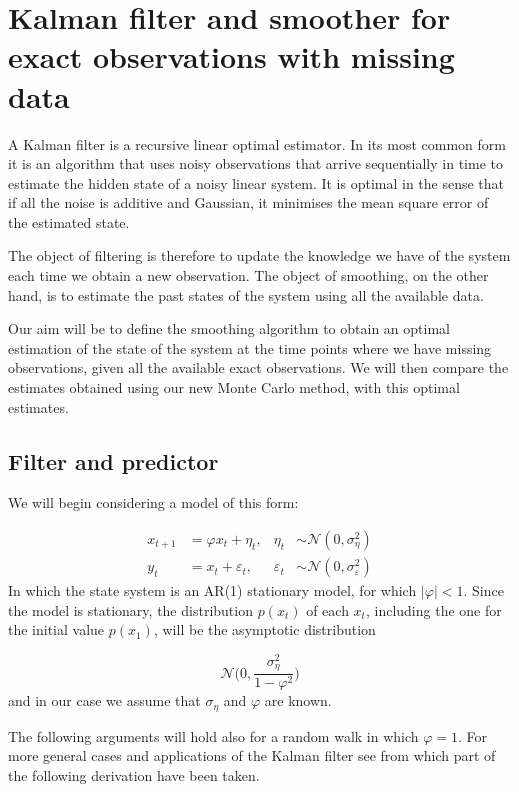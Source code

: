 \documentclass[11pt,a4paper]{article}
\begin{document}
\section{Kalman filter and smoother for exact observations with missing data}

A Kalman filter is a recursive linear optimal estimator. In its most common form it is an algorithm that uses noisy observations that arrive sequentially in time to estimate the hidden state of a noisy linear system. It is optimal in the sense that if all the noise is additive and Gaussian, it minimises the mean square error of the estimated state.

The object of filtering is therefore to update the knowledge we have of the system each time we obtain a new observation.
The object of smoothing, on the other hand, is to estimate the past states of the system using all the available data.

Our aim will be to define the smoothing algorithm to obtain an optimal estimation of the state of the system at the time points where we have missing observations, given all the available exact observations. We will then compare the estimates obtained using our new Monte Carlo method, with this optimal estimates. 

\subsection{Filter and predictor}

We will begin considering a model of this form:

\begin{align*}
    x_{t+1} &= \varphi x_t + \eta_t, & \eta_t &\sim \mathcal{N}(0,\sigma^2_\eta) \\
    y_t &= x_t + \varepsilon_t, & \varepsilon_t &\sim \mathcal{N}(0,\sigma^2_\varepsilon)
\end{align*}
In which the state system is an AR(1) stationary model, for which $|\varphi| < 1$. 
Since the model is stationary, the distribution $p(x_t)$ of each $x_t$, including the one for the initial value $p(x_{1})$, will be the asymptotic distribution

\[
    \mathcal{N} \Bigg (0, \frac{\sigma_\eta^2}{1- \varphi^2} \Bigg)
\]
and in our case we assume that $\sigma_\eta$ and $\varphi$ are known.

The following arguments will hold also for a random walk in which $\varphi = 1$. For more general cases and applications of the Kalman filter see \cite{Durbin} from which part of the following derivation have been taken.
\end{document}
